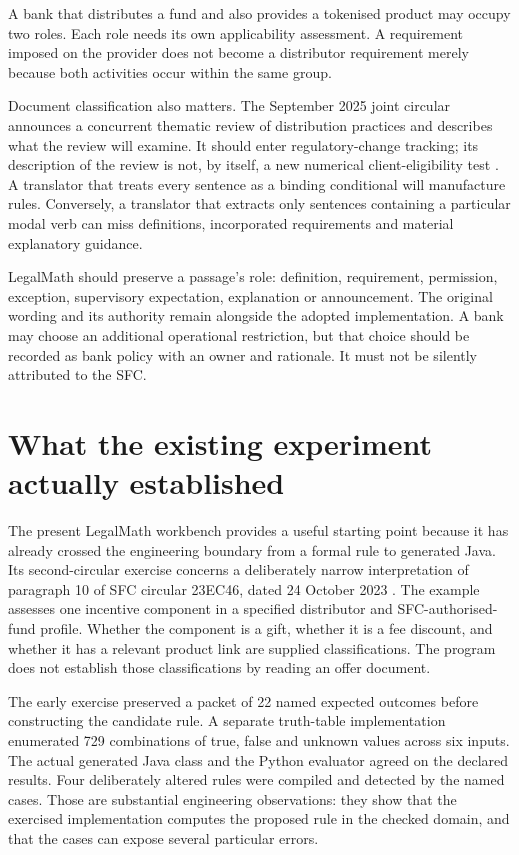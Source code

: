 \documentclass[12pt,a4paper,oneside,openany]{book}
\begin{document}
A bank that distributes a fund and also provides a tokenised product may occupy two roles. Each role needs its own applicability assessment. A requirement imposed on the provider does not become a distributor requirement merely because both activities occur within the same group.


Document classification also matters. The September 2025 joint circular announces
a concurrent thematic review of distribution practices and describes what the
review will examine. It should enter regulatory-change tracking; its description
of the review is not, by itself, a new numerical client-eligibility test
\citep{sfcreview2025}. A translator that treats every sentence as a binding
conditional will manufacture rules. Conversely, a translator that extracts only
sentences containing a particular modal verb can miss definitions, incorporated
requirements and material explanatory guidance.

LegalMath should preserve a passage's role: definition, requirement, permission,
exception, supervisory expectation, explanation or announcement. The original
wording and its authority remain alongside the adopted implementation. A bank may
choose an additional operational restriction, but that choice should be recorded
as bank policy with an owner and rationale. It must not be silently attributed to
the SFC.

\section{What the existing experiment actually established}
\label{merge:M01:01}

\label{sec:problem-evidence}
The present LegalMath workbench provides a useful starting point because it has
already crossed the engineering boundary from a formal rule to generated Java.
Its second-circular exercise concerns a deliberately narrow interpretation of
paragraph 10 of SFC circular 23EC46, dated 24 October 2023
\citep{sfcmarketing}. The example assesses one incentive component in a specified
distributor and SFC-authorised-fund profile. Whether the component is a gift,
whether it is a fee discount, and whether it has a relevant product link are
supplied classifications. The program does not establish those classifications
by reading an offer document.

The early exercise preserved a packet of 22 named expected outcomes before constructing
the candidate rule. A separate truth-table implementation enumerated 729
combinations of true, false and unknown values across six inputs. The actual
generated Java class and the Python evaluator agreed on the declared results.
Four deliberately altered rules were compiled and detected by the named cases.
Those are substantial engineering observations: they show that the exercised
implementation computes the proposed rule in the checked domain, and that the
cases can expose several particular errors.
\end{document}
